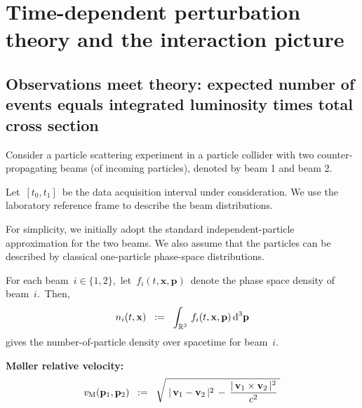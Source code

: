 

\chapter{Time-dependent perturbation theory and the interaction picture}
\setcounter{theorem}{0}
\setcounter{equation}{0}


\renewcommand{\theenumi}{\roman{enumi}}
\renewcommand{\labelenumi}{\textnormal{(\theenumi)}$\;\;$}


\vskip 0.5cm
\section{Observations meet theory: expected number of events equals integrated luminosity times total cross section}


Consider a particle scattering experiment in a particle collider
with two counter-propagating beams (of incoming particles),
denoted by beam 1 and beam 2.

\vskip 0.2cm
\noindent
Let \,$[t_0,t_1]$\, be the data acquisition interval under consideration. We use the laboratory reference frame to describe the beam distributions.

\vskip 0.2cm
\noindent
For simplicity, we initially adopt the standard independent-particle approximation for the two beams. We also assume that the particles can be described by classical one-particle phase-space distributions.

\vskip 0.2cm
\noindent
For each beam \,$i \in \{1,2\}$,\,
let \,$f_{i}(t,\mathbf{x},\mathbf{p})$\, denote
the phase space density of beam \,$i$.\,
Then,
\begin{equation*}
n_{i}(t,\mathbf{x})
\;\; := \;\;
    \int_{\mathbb{R}^3}\,
        f_{i}(t,\mathbf{x},\mathbf{p})
        \,\textnormal{d}^3\mathbf{p}
\end{equation*}
gives the number-of-particle density over spacetime for beam \,$i$.\,

\vskip 0.2cm
\noindent
\textbf{M{\o}ller relative velocity:}
\begin{equation*}
v_{\textnormal{M}}(\mathbf{p}_{1},\mathbf{p}_{2})
\;\; := \;\;
    \sqrt{
        {\color{white}.}
        \vert\,\mathbf{v}_{1} - \mathbf{v}_{2}\,\vert^{2}
        \, - \,
        \dfrac{
            \vert\,\mathbf{v}_{1} \times \mathbf{v}_{2}\,\vert^{2}
            }{
            c^{2}
            }
        {\color{white}.}
        }
\end{equation*}

